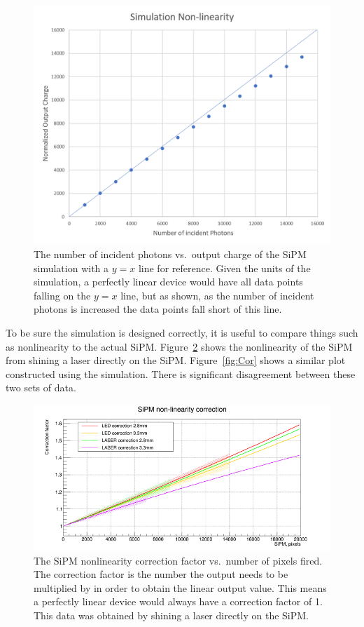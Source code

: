 \begin{figure}
\centering
\includegraphics[width=0.8\linewidth]{Figures/SimNon.png}
\caption{The number of incident photons vs.\ output charge of the SiPM simulation with a $y=x$ line for reference. Given the units of the simulation, a perfectly linear device would have all data points falling on the $y=x$ line, but as shown, as the number of incident photons is increased the data points fall short of this line.}
\label{fig:SimNon}
\end{figure}

To be sure the simulation is designed correctly, it is useful to compare things such as nonlinearity to the actual SiPM. Figure~\ref{fig:NonLin} shows the nonlinearity of the SiPM from shining a laser directly on the SiPM. Figure~\ref{fig:Cor} shows a similar plot constructed using the simulation. There is significant disagreement between these two sets of data.

\begin{figure}
\centering
\includegraphics[width=\linewidth]{Figures/LaserNonLin.png}
\caption{The SiPM nonlinearity correction factor vs.\ number of pixels fired. The correction factor is the number the output needs to be multiplied by in order to obtain the linear output value. This means a perfectly linear device would always have a correction factor of 1. This data was obtained by shining a laser directly on the SiPM.}
\label{fig:NonLin}
\end{figure}

